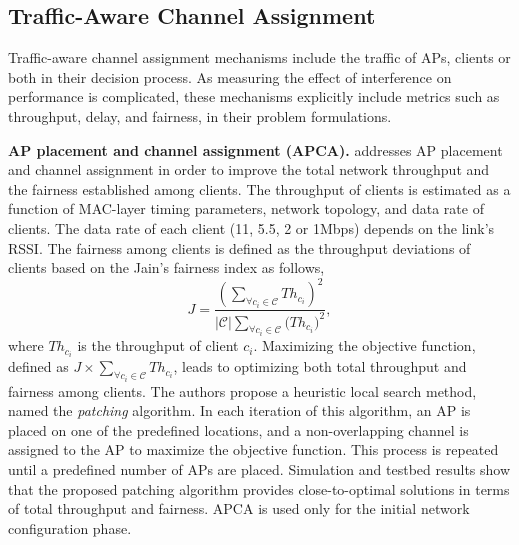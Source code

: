 




\subsection{Traffic-Aware Channel Assignment} 
\label{ChA_traffic_aware}
Traffic-aware channel assignment mechanisms include the traffic of APs, clients or both in their decision process.
As measuring the effect of interference on performance is complicated, these mechanisms explicitly include metrics such as throughput, delay, and fairness, in their problem formulations.


\label{APCA}
\textbf{AP placement and channel assignment (APCA).} 
\cite{J-AP-DCA-2006} addresses AP placement and channel assignment in order to improve the total network throughput and the fairness established among clients. 
The throughput of clients is estimated as a function of MAC-layer timing parameters, network topology, and data rate of clients. 
The data rate of each client (11, 5.5, 2 or 1Mbps) depends on the link's RSSI. 
The fairness among clients is defined as the throughput deviations of clients based on the Jain's fairness index \cite{Jain's-fairness} as follows,
%
\begin{equation}
\label{eq-fairness}
J  = \frac{(\sum_{\forall c_{i} \in \mathcal{C}}Th_{c_{i}})^2}{|\mathcal{C}|\sum_{\forall c_{i} \in \mathcal{C}}{(Th_{c_{i}}})^2},
\end{equation}
where $Th_{c_{i}}$ is the throughput of client $c_i$.
Maximizing the objective function, defined as $J\times \sum_{\forall c_{i} \in \mathcal{C}} Th_{c_{i}}$, leads to optimizing both total throughput and fairness among clients. 
The authors propose a heuristic local search method, named the \textit{patching} algorithm. 
In each iteration of this algorithm, an AP is placed on one of the predefined locations, and a non-overlapping channel is assigned to the AP to maximize the objective function.
This process is repeated until a predefined number of APs are placed. 
Simulation and testbed results show that the proposed patching algorithm provides close-to-optimal solutions in terms of total throughput and fairness. 
APCA is used only for the initial network configuration phase.

